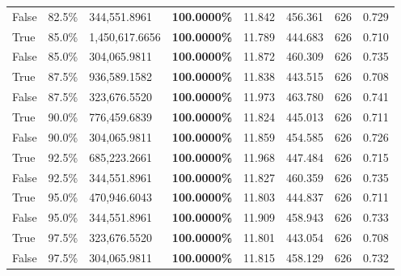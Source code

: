 \begin{table}[H]
\begin{tabular}{lllrllll}
\cline{1-8}
False & 82.5\% & 344,551.8961 & \bfseries \color{red} 100.0000\% & 11.842 & 456.361 & 626 & 0.729 \\
\cline{1-8}
True & 85.0\% & 1,450,617.6656 & \bfseries \color{red} 100.0000\% & 11.789 & 444.683 & 626 & 0.710 \\
\cline{1-8}
False & 85.0\% & \color{red} 304,065.9811 & \bfseries \color{red} 100.0000\% & 11.872 & 460.309 & 626 & 0.735 \\
\cline{1-8}
True & 87.5\% & 936,589.1582 & \bfseries \color{red} 100.0000\% & 11.838 & 443.515 & 626 & 0.708 \\
\cline{1-8}
False & 87.5\% & 323,676.5520 & \bfseries \color{red} 100.0000\% & 11.973 & 463.780 & 626 & 0.741 \\
\cline{1-8}
True & 90.0\% & 776,459.6839 & \bfseries \color{red} 100.0000\% & 11.824 & 445.013 & 626 & 0.711 \\
\cline{1-8}
False & 90.0\% & \color{red} 304,065.9811 & \bfseries \color{red} 100.0000\% & 11.859 & 454.585 & 626 & 0.726 \\
\cline{1-8}
True & 92.5\% & 685,223.2661 & \bfseries \color{red} 100.0000\% & 11.968 & 447.484 & 626 & 0.715 \\
\cline{1-8}
False & 92.5\% & 344,551.8961 & \bfseries \color{red} 100.0000\% & 11.827 & 460.359 & 626 & 0.735 \\
\cline{1-8}
True & 95.0\% & 470,946.6043 & \bfseries \color{red} 100.0000\% & 11.803 & 444.837 & 626 & 0.711 \\
\cline{1-8}
False & 95.0\% & 344,551.8961 & \bfseries \color{red} 100.0000\% & 11.909 & 458.943 & 626 & 0.733 \\
\cline{1-8}
True & 97.5\% & 323,676.5520 & \bfseries \color{red} 100.0000\% & 11.801 & 443.054 & 626 & 0.708 \\
\cline{1-8}
False & 97.5\% & \color{red} 304,065.9811 & \bfseries \color{red} 100.0000\% & 11.815 & 458.129 & 626 & 0.732 \\
\cline{1-8}
\bottomrule
\end{tabular}
\end{table}

